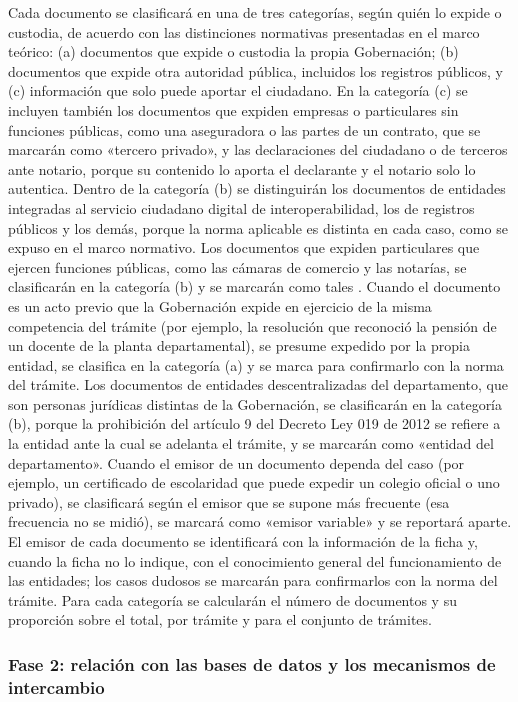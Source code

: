 Cada documento se clasificará en una de tres categorías, según quién lo expide o custodia, de acuerdo con las distinciones normativas presentadas en el marco teórico: (a) documentos que expide o custodia la propia Gobernación; (b) documentos que expide otra autoridad pública, incluidos los registros públicos, y (c) información que solo puede aportar el ciudadano. En la categoría (c) se incluyen también los documentos que expiden empresas o particulares sin funciones públicas, como una aseguradora o las partes de un contrato, que se marcarán como «tercero privado», y las declaraciones del ciudadano o de terceros ante notario, porque su contenido lo aporta el declarante y el notario solo lo autentica. Dentro de la categoría (b) se distinguirán los documentos de entidades integradas al servicio ciudadano digital de interoperabilidad, los de registros públicos y los demás, porque la norma aplicable es distinta en cada caso, como se expuso en el marco normativo. Los documentos que expiden particulares que ejercen funciones públicas, como las cámaras de comercio y las notarías, se clasificarán en la categoría (b) y se marcarán como tales . Cuando el documento es un acto previo que la Gobernación expide en ejercicio de la misma competencia del trámite (por ejemplo, la resolución que reconoció la pensión de un docente de la planta departamental), se presume expedido por la propia entidad, se clasifica en la categoría (a) y se marca para confirmarlo con la norma del trámite. Los documentos de entidades descentralizadas del departamento, que son personas jurídicas distintas de la Gobernación, se clasificarán en la categoría (b), porque la prohibición del artículo 9 del Decreto Ley 019 de 2012 se refiere a la entidad ante la cual se adelanta el trámite, y se marcarán como «entidad del departamento». Cuando el emisor de un documento dependa del caso (por ejemplo, un certificado de escolaridad que puede expedir un colegio oficial o uno privado), se clasificará según el emisor que se supone más frecuente (esa frecuencia no se midió), se marcará como «emisor variable» y se reportará aparte. El emisor de cada documento se identificará con la información de la ficha y, cuando la ficha no lo indique, con el conocimiento general del funcionamiento de las entidades; los casos dudosos se marcarán para confirmarlos con la norma del trámite. Para cada categoría se calcularán el número de documentos y su proporción sobre el total, por trámite y para el conjunto de trámites.

\subsubsection{Fase 2: relación con las bases de datos y los mecanismos de intercambio}

